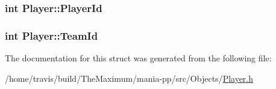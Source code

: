 \hypertarget{structPlayer_a6a71d7d9837a0a12e52ca47930965e0f}{
\subsubsection[{Player\-Id}]{\setlength{\rightskip}{0pt plus 5cm}int Player\-::\-Player\-Id}}\label{structPlayer_a6a71d7d9837a0a12e52ca47930965e0f}
\hypertarget{structPlayer_a350919664ba73d6d6cd6d03bd2a5cacd}{
\subsubsection[{Team\-Id}]{\setlength{\rightskip}{0pt plus 5cm}int Player\-::\-Team\-Id}}\label{structPlayer_a350919664ba73d6d6cd6d03bd2a5cacd}


The documentation for this struct was generated from the following file\-:\begin{DoxyCompactItemize}
\item 
/home/travis/build/\-The\-Maximum/mania-\/pp/src/\-Objects/\hyperlink{Player_8h}{Player.\-h}\end{DoxyCompactItemize}
